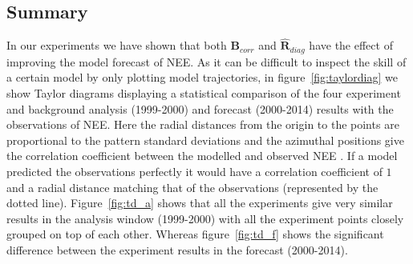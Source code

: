 \documentclass[11pt]{article}
\begin{document}
\subsection{Summary}

In our experiments we have shown that both $\textbf{B}_{corr}$ and $\hat{\textbf{R}}_{diag}$ have the effect of improving the model forecast of NEE. As it can be difficult to inspect the skill of a certain model by only plotting model trajectories, in figure~\ref{fig:taylordiag} we show Taylor diagrams displaying a statistical comparison of the four experiment and background analysis (1999-2000) and forecast (2000-2014) results with the observations of NEE. Here the radial distances from the origin to the points are proportional to the pattern standard deviations and the azimuthal positions give the correlation coefficient between the modelled and observed NEE \citep{Taylor2001}. If a model predicted the observations perfectly it would have a correlation coefficient of $1$ and a radial distance matching that of the observations (represented by the dotted line). Figure~\ref{fig:td_a} shows that all the experiments give very similar results in the analysis window (1999-2000) with all the experiment points closely grouped on top of each other. Whereas figure~\ref{fig:td_f} shows the significant difference between the experiment results in the forecast (2000-2014).
\end{document}
